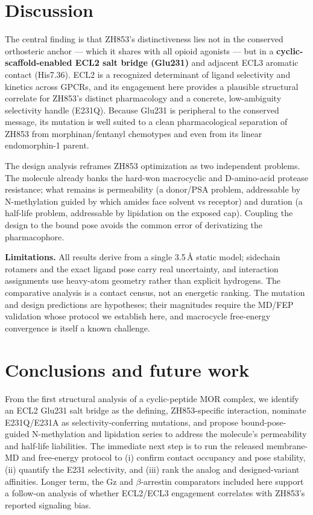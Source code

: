 \documentclass[11pt]{article}
\newcommand{\Ang}{\AA}
\newcommand{\bt}{$\beta$}
\begin{document}
\section{Discussion}

The central finding is that ZH853's distinctiveness lies not in the conserved orthosteric anchor ---
which it shares with all opioid agonists --- but in a \textbf{cyclic-scaffold-enabled ECL2 salt bridge
(Glu231)} and adjacent ECL3 aromatic contact (His7.36). ECL2 is a recognized determinant of ligand
selectivity and kinetics across GPCRs, and its engagement here provides a plausible structural
correlate for ZH853's distinct pharmacology and a concrete, low-ambiguity selectivity handle (E231Q).
Because Glu231 is peripheral to the conserved message, its mutation is well suited to a clean
pharmacological separation of ZH853 from morphinan/fentanyl chemotypes and even from its linear
endomorphin-1 parent.

The design analysis reframes ZH853 optimization as two independent problems. The molecule already banks
the hard-won macrocyclic and D-amino-acid protease resistance; what remains is permeability (a
donor/PSA problem, addressable by N-methylation guided by which amides face solvent vs receptor) and
duration (a half-life problem, addressable by lipidation on the exposed cap). Coupling the design to
the bound pose avoids the common error of derivatizing the pharmacophore.

\textbf{Limitations.} All results derive from a single 3.5\,\Ang{} static model; sidechain rotamers and
the exact ligand pose carry real uncertainty, and interaction assignments use heavy-atom geometry
rather than explicit hydrogens. The comparative analysis is a contact census, not an energetic ranking.
The mutation and design predictions are hypotheses; their magnitudes require the MD/FEP validation whose
protocol we establish here, and macrocycle free-energy convergence is itself a known challenge.

\section{Conclusions and future work}

From the first structural analysis of a cyclic-peptide MOR complex, we identify an ECL2 Glu231 salt
bridge as the defining, ZH853-specific interaction, nominate E231Q/E231A as selectivity-conferring
mutations, and propose bound-pose-guided N-methylation and lipidation series to address the molecule's
permeability and half-life liabilities. The immediate next step is to run the released membrane-MD and
free-energy protocol to (i) confirm contact occupancy and pose stability, (ii) quantify the E231
selectivity, and (iii) rank the analog and designed-variant affinities. Longer term, the Gz and
\bt-arrestin comparators included here support a follow-on analysis of whether ECL2/ECL3 engagement
correlates with ZH853's reported signaling bias.
\end{document}
